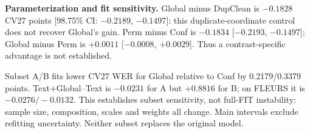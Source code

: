 \noindent\textbf{Parameterization and fit sensitivity.} Global minus DupClean is $-0.1828$ CV27 points [98.75\% CI: $-0.2189$, $-0.1497$]: this duplicate-coordinate control does not recover Global's gain. Perm minus Conf is $-0.1834$ [$-0.2193$, $-0.1497$]; Global minus Perm is $+0.0011$ [$-0.0008$, $+0.0029$]. Thus a contrast-specific advantage is not established.

Subset A/B fits lower CV27 WER for Global relative to Conf by 0.2179/0.3379 points. Text+Global--Text is $-0.0231$ for A but $+0.8816$ for B; on FLEURS it is $-0.0276/-0.0132$. This establishes subset sensitivity, not full-FIT instability: sample size, composition, scales and weights all change. Main intervals exclude refitting uncertainty. Neither subset replaces the original model.
